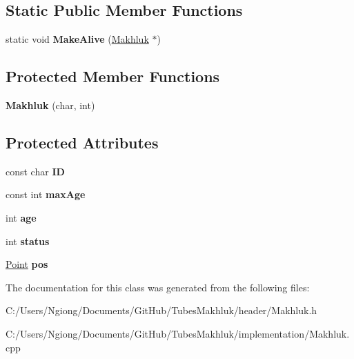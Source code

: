 \subsection*{Static Public Member Functions}
\begin{DoxyCompactItemize}
\item 
static void {\bfseries Make\+Alive} (\hyperlink{class_makhluk}{Makhluk} $\ast$)\hypertarget{class_makhluk_a46b686a6f1533958650a60e3d7268b99}{}\label{class_makhluk_a46b686a6f1533958650a60e3d7268b99}

\end{DoxyCompactItemize}
\subsection*{Protected Member Functions}
\begin{DoxyCompactItemize}
\item 
{\bfseries Makhluk} (char, int)\hypertarget{class_makhluk_afd36e7fe75e525a38d5cfc8a1e6b48be}{}\label{class_makhluk_afd36e7fe75e525a38d5cfc8a1e6b48be}

\end{DoxyCompactItemize}
\subsection*{Protected Attributes}
\begin{DoxyCompactItemize}
\item 
const char {\bfseries ID}\hypertarget{class_makhluk_a287dd5d101d81990399f00f4a77a36f5}{}\label{class_makhluk_a287dd5d101d81990399f00f4a77a36f5}

\item 
const int {\bfseries max\+Age}\hypertarget{class_makhluk_a50350ef02b62af484c769b8118f8c4ae}{}\label{class_makhluk_a50350ef02b62af484c769b8118f8c4ae}

\item 
int {\bfseries age}\hypertarget{class_makhluk_aacf25b9c59e644e709b730f5239996f6}{}\label{class_makhluk_aacf25b9c59e644e709b730f5239996f6}

\item 
int {\bfseries status}\hypertarget{class_makhluk_aa3eefed357a56f6b86f0080083d91d31}{}\label{class_makhluk_aa3eefed357a56f6b86f0080083d91d31}

\item 
\hyperlink{class_point}{Point} {\bfseries pos}\hypertarget{class_makhluk_a920e46e39a404909a292802669bed0c2}{}\label{class_makhluk_a920e46e39a404909a292802669bed0c2}

\end{DoxyCompactItemize}


The documentation for this class was generated from the following files\+:\begin{DoxyCompactItemize}
\item 
C\+:/\+Users/\+Ngiong/\+Documents/\+Git\+Hub/\+Tubes\+Makhluk/header/Makhluk.\+h\item 
C\+:/\+Users/\+Ngiong/\+Documents/\+Git\+Hub/\+Tubes\+Makhluk/implementation/Makhluk.\+cpp\end{DoxyCompactItemize}

